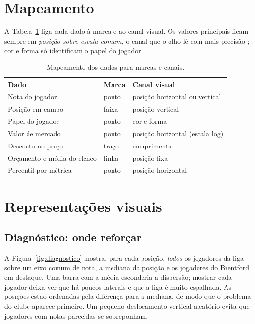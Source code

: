 \documentclass[10pt, a4paper, twocolumn]{article}
\begin{document}
\section{Mapeamento}

A Tabela~\ref{tab:mapeamento} liga cada dado à marca e ao canal visual. Os valores principais ficam sempre em \emph{posição sobre escala comum}, o canal que o olho lê com mais precisão \citep{cleveland1984,munzner2014}; cor e forma só identificam o papel do jogador.

\begin{table}[h]
	\caption{Mapeamento dos dados para marcas e canais.}
	\label{tab:mapeamento}
	\footnotesize
	\centering
	\begin{tabular}{p{2.3cm}p{1.3cm}p{3.3cm}}
		\toprule
		Dado & Marca & Canal visual \\
		\midrule
		Nota do jogador & ponto & posição horizontal ou vertical \\
		Posição em campo & faixa & posição vertical \\
		Papel do jogador & ponto & cor e forma \\
		Valor de mercado & ponto & posição horizontal (escala log) \\
		Desconto no preço & traço & comprimento \\
		Orçamento e média do elenco & linha & posição fixa \\
		Percentil por métrica & ponto & posição horizontal \\
		\bottomrule
	\end{tabular}
\end{table}

\section{Representações visuais}

\subsection*{Diagnóstico: onde reforçar}

A Figura~\ref{fig:diagnostico} mostra, para cada posição, \emph{todos} os jogadores da liga sobre um eixo comum de nota, a mediana da posição e os jogadores do Brentford em destaque. Uma barra com a média esconderia a dispersão; mostrar cada jogador deixa ver que há poucos laterais e que a liga é muito espalhada. As posições estão ordenadas pela diferença para a mediana, de modo que o problema do clube aparece primeiro. Um pequeno deslocamento vertical aleatório evita que jogadores com notas parecidas se sobreponham.
\end{document}
